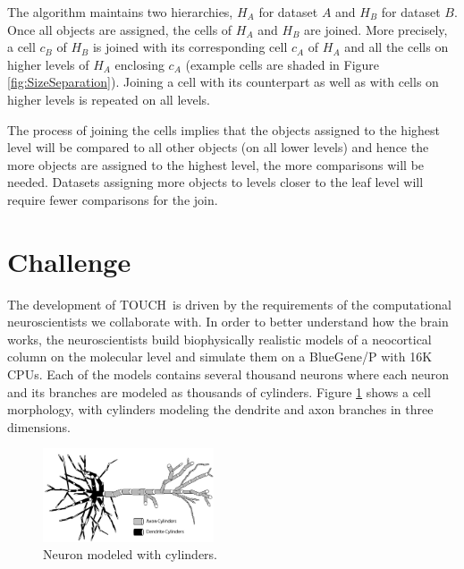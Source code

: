 \documentclass{vldb}
\newcommand{\fref}[1]{Figure \ref{#1}}
\newcommand{\SJ}{TOUCH}
\begin{document}
The algorithm maintains two hierarchies, $H_A$ for dataset $A$ and $H_B$ for dataset $B$. Once all objects are assigned, the cells of $H_A$ and $H_B$ are
joined. More precisely, a cell $c_B$ of $H_B$ is joined with its corresponding cell $c_A$ of $H_A$ and all the cells on higher levels of $H_A$ enclosing $c_A$
(example cells are shaded in \fref{fig:SizeSeparation}). Joining a cell with its counterpart as well as with cells on higher levels is repeated on all levels.

The process of joining the cells implies that the objects assigned to the highest level will be compared to all other objects (on all lower levels) and hence
the more objects are assigned to the highest level, the more comparisons will be needed. Datasets assigning more objects to levels closer to the leaf level will
require fewer comparisons for the join.


\section{Challenge}
\label{s_motivation}
The development of \SJ~is driven by the requirements of the computational neuroscientists we collaborate with. In order to better understand how the brain
works, the neuroscientists build biophysically realistic models of a neocortical column on the molecular level and simulate them on a BlueGene/P with 16K CPUs.
Each of the models contains several thousand neurons where each neuron and its branches are modeled as thousands of cylinders. \fref{f_representation} shows a
cell morphology, with cylinders modeling the dendrite and axon branches in three dimensions.

\begin{figure}[h!]
  \begin{center}
      \includegraphics[angle=0, width=0.45\textwidth]{figures/neuron}
\vspace{-3mm}
		\caption{Neuron modeled with cylinders.}
      \label{f_representation}
  \end{center}
\vspace{-5mm}
\end{figure}
\end{document}
